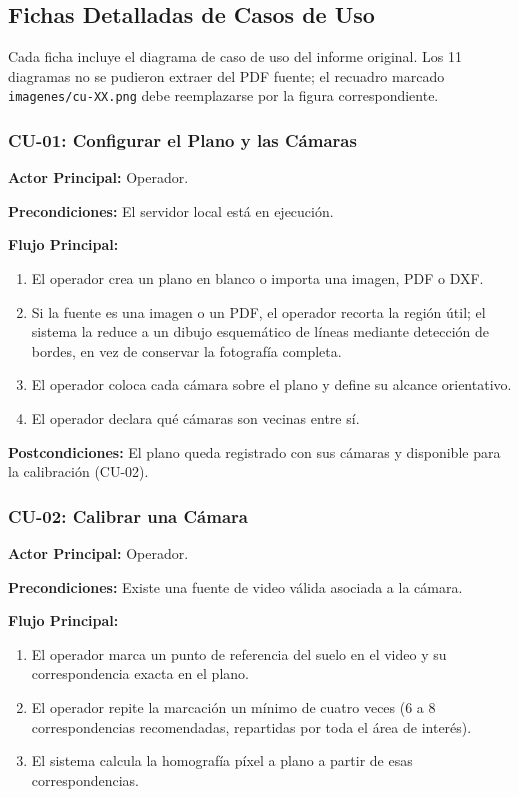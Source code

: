 \subsection{Fichas Detalladas de Casos de Uso}
\label{subsec:casos-uso-detalle}

Cada ficha incluye el diagrama de caso de uso del informe original. Los 11 diagramas no
se pudieron extraer del PDF fuente; el recuadro marcado \texttt{imagenes/cu-XX.png} debe
reemplazarse por la figura correspondiente.

\subsubsection{CU-01: Configurar el Plano y las Cámaras}
\textbf{Actor Principal:} Operador.

\textbf{Precondiciones:} El servidor local está en ejecución.

\textbf{Flujo Principal:}
\begin{enumerate}
  \item El operador crea un plano en blanco o importa una imagen, PDF o DXF.
  \item Si la fuente es una imagen o un PDF, el operador recorta la región útil; el sistema la
  reduce a un dibujo esquemático de líneas mediante detección de bordes, en vez de
  conservar la fotografía completa.
  \item El operador coloca cada cámara sobre el plano y define su alcance orientativo.
  \item El operador declara qué cámaras son vecinas entre sí.
\end{enumerate}

\textbf{Postcondiciones:} El plano queda registrado con sus cámaras y disponible para la
calibración (CU-02).


\subsubsection{CU-02: Calibrar una Cámara}
\textbf{Actor Principal:} Operador.

\textbf{Precondiciones:} Existe una fuente de video válida asociada a la cámara.

\textbf{Flujo Principal:}
\begin{enumerate}
  \item El operador marca un punto de referencia del suelo en el video y su correspondencia
  exacta en el plano.
  \item El operador repite la marcación un mínimo de cuatro veces (6 a 8 correspondencias
  recomendadas, repartidas por toda el área de interés).
  \item El sistema calcula la homografía píxel a plano a partir de esas correspondencias.
\end{enumerate}


